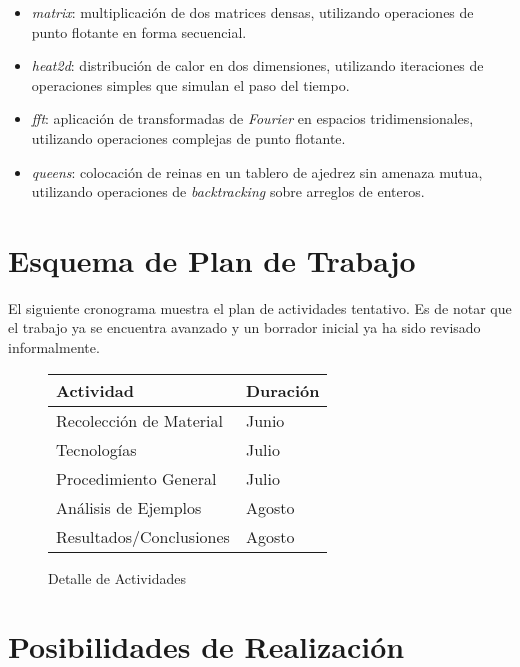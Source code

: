 \documentclass[a4paper]{article}
\begin{document}
\begin{itemize}

\item \emph{matrix}: multiplicaci\'on de dos matrices densas, utilizando
  operaciones de punto flotante en forma secuencial.

\item \emph{heat2d}: distribuci\'on de calor en dos dimensiones, utilizando
  iteraciones de operaciones simples que simulan el paso del tiempo.

\item \emph{fft}: aplicaci\'on de transformadas de {\it Fourier} en espacios
  tridimensionales, utilizando operaciones complejas de punto flotante.

\item \emph{queens}: colocaci\'on de reinas en un tablero de ajedrez sin
  amenaza mutua, utilizando operaciones de {\it backtracking} sobre arreglos
  de enteros.

\end{itemize}

\section{Esquema de Plan de Trabajo}

El siguiente cronograma muestra el plan de actividades tentativo.
Es de notar que el trabajo ya se encuentra avanzado y un borrador
inicial ya ha sido revisado informalmente.

\begin{figure}[H]
  \begin{center}
    \begin{tabular}{|l|l|}\hline
      {\bf Actividad} & {\bf Duraci\'on} \\ \hline
      Recolecci\'on de Material & Junio \\ \hline
      Tecnolog\'ias & Julio \\ \hline
      Procedimiento General & Julio \\ \hline
      An\'alisis de Ejemplos & Agosto \\ \hline
      Resultados/Conclusiones & Agosto \\ \hline
    \end{tabular}
    \caption{Detalle de Actividades}
  \end{center}
  \label{schedule}
\end{figure}

\section{Posibilidades de Realizaci\'on}
\end{document}
